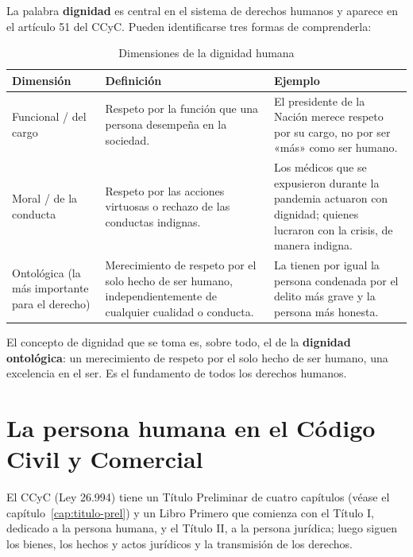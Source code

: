 \documentclass[12pt,oneside]{book}
\begin{document}
La palabra \textbf{dignidad} es central en el sistema de derechos humanos y aparece en el artículo 51 del CCyC. Pueden identificarse tres formas de comprenderla:

\begin{table}[H]
\centering
\begin{tabularx}{\textwidth}{B{0.19\textwidth} Y Y}
\toprule
\textbf{Dimensión} & \textbf{Definición} & \textbf{Ejemplo} \\
\midrule
Funcional / del cargo & Respeto por la función que una persona desempeña en la sociedad. & El presidente de la Nación merece respeto por su cargo, no por ser «más» como ser humano. \\
Moral / de la conducta & Respeto por las acciones virtuosas o rechazo de las conductas indignas. & Los médicos que se expusieron durante la pandemia actuaron con dignidad; quienes lucraron con la crisis, de manera indigna. \\
Ontológica (la más importante para el derecho) & Merecimiento de respeto por el solo hecho de ser humano, independientemente de cualquier cualidad o conducta. & La tienen por igual la persona condenada por el delito más grave y la persona más honesta. \\
\bottomrule
\end{tabularx}
\caption{Dimensiones de la dignidad humana}
\end{table}

\begin{importante}
El concepto de dignidad que se toma es, sobre todo, el de la \textbf{dignidad ontológica}: un merecimiento de respeto por el solo hecho de ser humano, una excelencia en el ser. Es el fundamento de todos los derechos humanos.
\end{importante}

\section{La persona humana en el Código Civil y Comercial}

El CCyC (Ley 26.994) tiene un Título Preliminar de cuatro capítulos (véase el capítulo~\ref{cap:titulo-prel}) y un Libro Primero que comienza con el Título I, dedicado a la persona humana, y el Título II, a la persona jurídica; luego siguen los bienes, los hechos y actos jurídicos y la transmisión de los derechos.
\end{document}
